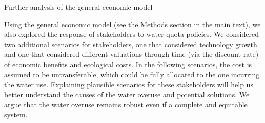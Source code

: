 Further analysis of the general economic model

Using the general economic model (see the Methods section in the main text), we also explored the response of stakeholders to water quota policies. We considered two additional scenarios for stakeholders, one that considered technology growth and one that considered different valuations through time (via the discount rate) of economic benefits and ecological costs. In the following scenarios, the cost is assumed to be untransferable, which could be fully allocated to the one incurring the water use. Explaining plausible scenarios for these stakeholders will help us better understand the causes of the water overuse and potential solutions. We argue that the water overuse remains robust even if a complete and equitable system.


